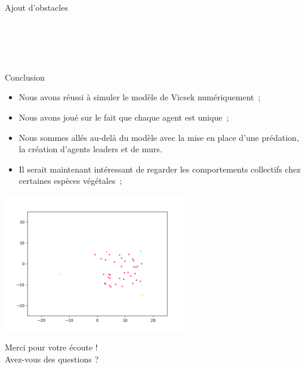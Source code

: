 \documentclass[aspectratio=43, a4paper, 12pt]{beamer}
\begin{document}
\begin{frame}{Ajout d'obstacles}
\end{frame}

\section*{\ }
	\begin{frame}{Conclusion}
		
			\begin{itemize}
				\item<1-> Nous avons réussi à simuler le modèle de Vicsek numériquement~;
				\item<2-> Nous avons joué sur le fait que chaque agent est unique~;
				\item<3-> Nous sommes allés au-delà du modèle avec la mise en place d'une prédation, la création d'agents leaders et de murs.
				\item<4-> Il serait maintenant intéressant de regarder les comportements collectifs chez certaines espèces végétales~;
			\end{itemize}
\end{frame}		
\begin{frame}	
\begin{center} \includegraphics[width=8cm]{images/image_9.png}  \end{center}
\begin{center} Merci pour votre écoute ! \\ Avez-vous des questions ? \end{center}
\end{frame}
\end{document}
